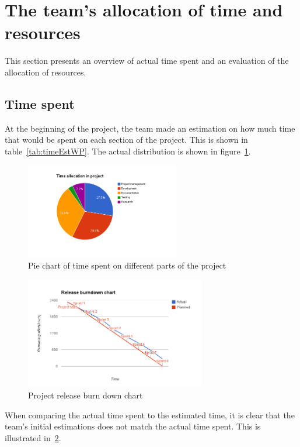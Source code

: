 \section{The team's allocation of time and resources}
\label{sec:timeSpent}
This section presents an overview of actual time spent and an evaluation of the allocation of resources.

\subsection{Time spent}
At the beginning of the project, the team made an estimation on how much time that would be spent on each section of the project. This is shown in table~\ref{tab:timeEstWP}. The actual distribution is shown in figure~\ref{fig:piechart}.

\begin{figure}[H]
\centering
\includegraphics[width=0.6\textwidth, clip, trim=4cm 2cm 4cm 1cm]{ch/retrospect/fig/timePie.png}
\caption{Pie chart of time spent on different parts of the project}
\label{fig:piechart}
\end{figure}

\begin{figure}[H]
\centering
\includegraphics[width=0.7\textwidth, clip, trim=1.1cm 0.5cm 1.2cm 1cm]{ch/retrospect/fig/release.png}
\caption{Project release burn down chart}
\label{fig:release}
\end{figure}

When comparing the actual time spent to the estimated time, it is clear that the team's initial estimations does not match the actual time spent. This is illustrated in~\ref{fig:release}.

